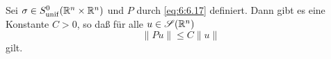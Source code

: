 \begin{thm}
Sei $\sigma\in S^0_{\rm unif}(\mathbb R^n\times\mathbb R^n)$ und $P$ durch \eqref{eq:6:6.17} definiert. Dann gibt es eine Konstante $C>0$, so daß für alle $u\in\mathscr S(\mathbb R^n)$
\begin{equation}
   \| Pu\| \le C \|u\|
\end{equation}
gilt.
\end{thm}
%


